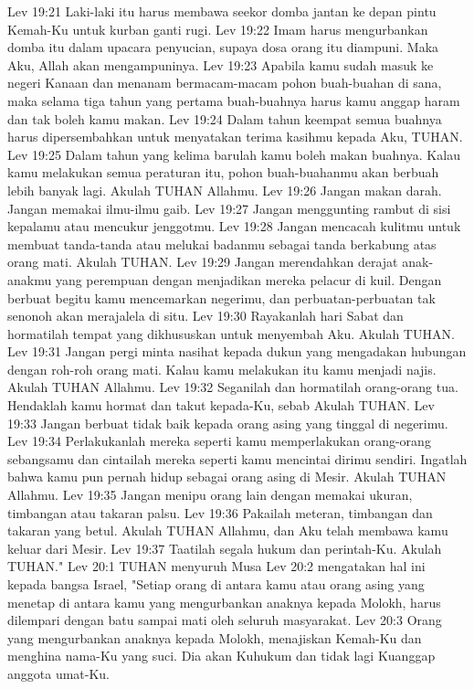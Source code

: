 Lev 19:21  Laki-laki itu harus membawa seekor domba jantan ke depan pintu Kemah-Ku untuk kurban ganti rugi.
Lev 19:22  Imam harus mengurbankan domba itu dalam upacara penyucian, supaya dosa orang itu diampuni. Maka Aku, Allah akan mengampuninya.
Lev 19:23  Apabila kamu sudah masuk ke negeri Kanaan dan menanam bermacam-macam pohon buah-buahan di sana, maka selama tiga tahun yang pertama buah-buahnya harus kamu anggap haram dan tak boleh kamu makan.
Lev 19:24  Dalam tahun keempat semua buahnya harus dipersembahkan untuk menyatakan terima kasihmu kepada Aku, TUHAN.
Lev 19:25  Dalam tahun yang kelima barulah kamu boleh makan buahnya. Kalau kamu melakukan semua peraturan itu, pohon buah-buahanmu akan berbuah lebih banyak lagi. Akulah TUHAN Allahmu.
Lev 19:26  Jangan makan darah. Jangan memakai ilmu-ilmu gaib.
Lev 19:27  Jangan menggunting rambut di sisi kepalamu atau mencukur jenggotmu.
Lev 19:28  Jangan mencacah kulitmu untuk membuat tanda-tanda atau melukai badanmu sebagai tanda berkabung atas orang mati. Akulah TUHAN.
Lev 19:29  Jangan merendahkan derajat anak-anakmu yang perempuan dengan menjadikan mereka pelacur di kuil. Dengan berbuat begitu kamu mencemarkan negerimu, dan perbuatan-perbuatan tak senonoh akan merajalela di situ.
Lev 19:30  Rayakanlah hari Sabat dan hormatilah tempat yang dikhususkan untuk menyembah Aku. Akulah TUHAN.
Lev 19:31  Jangan pergi minta nasihat kepada dukun yang mengadakan hubungan dengan roh-roh orang mati. Kalau kamu melakukan itu kamu menjadi najis. Akulah TUHAN Allahmu.
Lev 19:32  Seganilah dan hormatilah orang-orang tua. Hendaklah kamu hormat dan takut kepada-Ku, sebab Akulah TUHAN.
Lev 19:33  Jangan berbuat tidak baik kepada orang asing yang tinggal di negerimu.
Lev 19:34  Perlakukanlah mereka seperti kamu memperlakukan orang-orang sebangsamu dan cintailah mereka seperti kamu mencintai dirimu sendiri. Ingatlah bahwa kamu pun pernah hidup sebagai orang asing di Mesir. Akulah TUHAN Allahmu.
Lev 19:35  Jangan menipu orang lain dengan memakai ukuran, timbangan atau takaran palsu.
Lev 19:36  Pakailah meteran, timbangan dan takaran yang betul. Akulah TUHAN Allahmu, dan Aku telah membawa kamu keluar dari Mesir.
Lev 19:37  Taatilah segala hukum dan perintah-Ku. Akulah TUHAN."
Lev 20:1  TUHAN menyuruh Musa
Lev 20:2  mengatakan hal ini kepada bangsa Israel, "Setiap orang di antara kamu atau orang asing yang menetap di antara kamu yang mengurbankan anaknya kepada Molokh, harus dilempari dengan batu sampai mati oleh seluruh masyarakat.
Lev 20:3  Orang yang mengurbankan anaknya kepada Molokh, menajiskan Kemah-Ku dan menghina nama-Ku yang suci. Dia akan Kuhukum dan tidak lagi Kuanggap anggota umat-Ku.
